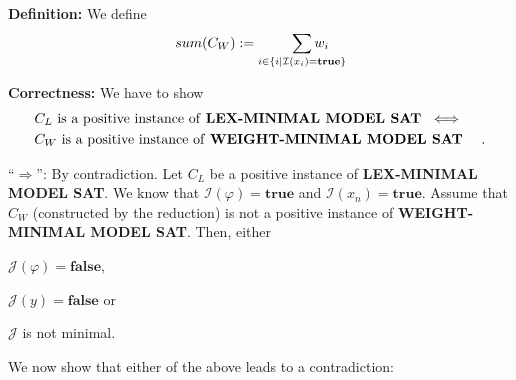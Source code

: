 \documentclass [11pt]{article}
\renewcommand{\phi}{\varphi}
\newcommand{\True}{\mathbf{true}}
\newcommand{\False}{\mathbf{false}}
\newcommand{\MINWEIGHTSAT}{\textbf{WEIGHT-MINIMAL MODEL SAT}}
\newcommand{\MINLEXSAT}{\textbf{LEX-MINIMAL MODEL SAT}}
\newcommand{\mI}{\ensuremath{\mathcal{I}}}
\newcommand{\mJ}{\ensuremath{\mathcal{J}}}
\begin{document}
\noindent
\textbf{Definition:} We define 
\begin{align*}
sum(C_W) &: = \smashoperator[r]{ \sum_{i\in \{i \mid \mI(x_i) = \True\}} } w_i
\end{align*}

\noindent
\textbf{Correctness:}
We have to show
\begin{align*}
& C_L \text{ is a positive instance of \MINLEXSAT\ } \iff \\
& C_W \text{ is a positive instance of \MINWEIGHTSAT\ } \quad .
\end{align*}

``$\Rightarrow$'': By contradiction. Let $C_L$ be a positive instance of \MINLEXSAT.
We know that $\mI(\phi) = \True$ and $\mI(x_n) = \True$.
Assume that $C_W$ (constructed by the reduction) is not a positive instance of \MINWEIGHTSAT.
Then, either 
\begin{inparaenum}
\item $\mJ(\phi) = \False $,
\item $\mJ(y) = \False$ or
\item $\mJ$ is not minimal.
\end{inparaenum}
We now show that either of the above leads to a contradiction:
\end{document}
